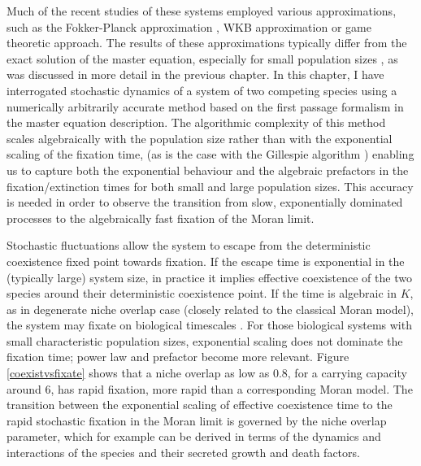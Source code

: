 Much of the recent studies of these systems employed various approximations, such as the Fokker-Planck approximation \cite{Chotibut2015,Dobrinevski2012,Fisher2014,Constable2015,Lin2012}, WKB approximation \cite{Kessler2007,Gabel2013} or game theoretic \cite{Antal2006} approach. 
The results of these approximations typically differ from the exact solution of the master equation, especially for small population sizes \cite{Doering2005,Kessler2007,Ovaskainen2010,Assaf2016,Badali2018}, as was discussed in more detail in the previous chapter. 
In this chapter, I have interrogated stochastic dynamics of a system of two competing species using a numerically arbitrarily accurate method based on the first passage formalism in the master equation description. 
The algorithmic complexity of this method scales algebraically with the population size rather than with the exponential scaling of the fixation time, (as is the case with the Gillespie algorithm \cite{Gillespie1977}) enabling us to capture both the exponential behaviour and the algebraic prefactors in the fixation/extinction times for both small and large population sizes. %
This accuracy is needed in order to observe the transition from slow, exponentially dominated processes to the algebraically fast fixation of the Moran limit. 

Stochastic fluctuations allow the system to escape from the deterministic coexistence fixed point towards fixation. 
If the escape time is exponential in the (typically large) system size, in practice it implies effective coexistence of the two species around their deterministic coexistence point. 
If the time is algebraic in $K$, as in degenerate niche overlap case (closely related to the classical Moran model), the system may fixate on biological timescales \cite{Kimura1964,Moran1962}. 
For those biological systems with small characteristic population sizes, exponential scaling does not dominate the fixation time; power law and prefactor become more relevant. 
Figure \ref{coexistvsfixate} shows that a niche overlap as low as $0.8$, for a carrying capacity around $6$, has rapid fixation, more rapid than a corresponding Moran model. %
The transition between the exponential scaling of effective coexistence time to the rapid stochastic fixation in the Moran limit is governed by the niche overlap parameter, which for example can be derived in terms of the dynamics and interactions of the species and their secreted growth and death factors. %

